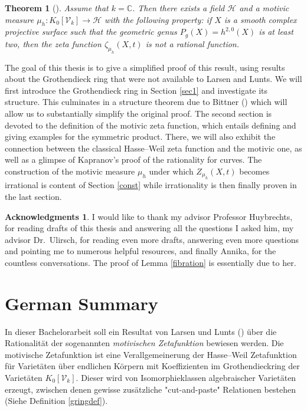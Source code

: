 \documentclass[11pt, a4paper, english, twoside]{article}
\theoremstyle{plain}
\newtheorem{theorem}{Theorem}[section]
\theoremstyle{definition}
\newtheorem*{acks}{Acknowledgments}
\newcommand{\gring}[1][k]{K_0[\mathcal{V}_#1]}
\begin{document}
\begin{theorem}[{\cite[Thm.\ 1.6]{MR1996804}}]
\label{irrational}
Assume that $k = \mathbb{C}$. 
Then there exists a field $\mathcal{H}$ and a motivic measure $\mu_h \colon \gring \to \mathcal{H}$ with the following
property: if $X$ is a smooth complex projective surface such that the geometric genus $P_g(X)=h^{2,0}(X)$ is at least two, 
then the zeta function $\zeta_{\mu_h}(X,t)$ is not a rational function.
\end{theorem}

The goal of this thesis is to give a simplified proof of this result, using results about the Grothendieck ring that were not available
to Larsen and Lunts.
We will first introduce the Grothendieck ring in Section \ref{sec1} and investigate its structure. 
This culminates in a structure theorem due to Bittner (\cite[Thm 3.1]{Bittner}) which will allow us to substantially simplify the original 
proof.
The second section is devoted to the definition of the motivic zeta function, which entails defining and giving examples for the symmetric 
product. There, we will also exhibit the connection between the classical Hasse--Weil zeta function and the motivic one, as well as a glimpse of
Kapranov's proof of the rationality for curves.
The construction of the motivic measure $\mu_h$ under which $Z_{\mu_h}(X,t)$ becomes irrational is content of Section \ref{const} while irrationality
is then finally proven in the last section.

\begin{acks}
    I would like to thank my advisor Professor Huybrechts, for reading drafts of this thesis and answering all the questions I asked him, 
    my advisor Dr.\ Ulirsch, for reading even more drafts, answering even more questions and pointing me to numerous helpful resources, 
    and finally Annika, for the countless
    conversations. The proof of Lemma \ref{fibration} is essentially due to her.
\end{acks}

\section{German Summary}
In dieser Bachelorarbeit soll ein Resultat von Larsen und Lunts (\cite{MR1996804}) über die Rationalität der sogenannten 
\emph{motivischen Zetafunktion}
bewiesen werden. Die motivische Zetafunktion ist eine Verallgemeinerung der Hasse--Weil Zetafunktion für Varietäten über endlichen Körpern
mit Koeffizienten im Grothendieckring der Varietäten $\gring[k]$. Dieser wird von Isomorphieklassen algebraischer Varietäten erzeugt, 
zwischen denen gewisse zusätzliche "cut-and-paste" Relationen bestehen (Siehe Definition \ref{gringdef}). 
\end{document}
